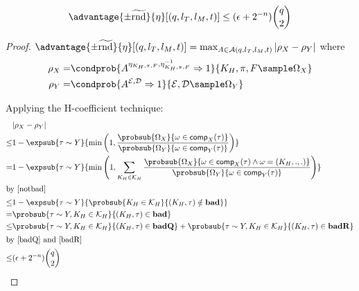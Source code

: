 \documentclass[eprint.tex]{subfiles}
\begin{document}
\begin{lemma} \label{xyadv}
    \begin{displaymath}
        \advantage{\pm \widetilde{\mathrm{rnd}}}{\eta}[(q, l_T, l_M, t)]
        \leq (\epsilon + 2^{-n})\binom{q}{2}
    \end{displaymath}
\end{lemma}

\begin{proof}
    $\advantage{\pm \widetilde{\mathrm{rnd}}}{\eta}[(q, l_T, l_M, t)]
    = \max_{A \in \mathcal{A}(q, l_T, l_M, t)} |\rho_X - \rho_Y|$ where
    \begin{align*}
        \rho_X =& \condprob{A^{\eta_{K_H, \pi, F}, \eta_{K_H, \pi, F}^{-1}}\Rightarrow 1}{K_H, \pi, F \sample \Omega_X} \\
        \rho_Y =& \condprob{A^{\mathcal{E}, \mathcal{D}}\Rightarrow 1}{\mathcal{E}, \mathcal{D} \sample \Omega_Y} \\
    \end{align*}

    Applying the H-coefficient technique:
    \begin{align*}
        &|\rho_X - \rho_Y| \\
        \leq& 1 - \expsub{\tau \sim Y}{\min
            \left(1,
               \frac{\probsub{\Omega_X}{\omega \in \comp_X(\tau)}}
               {\probsub{\Omega_Y}{\omega \in \comp_Y(\tau)}}
            \right)} \\
        =& 1 - \expsub{\tau \sim Y}{\min
            \left(1, \sum_{K_H \in \mathcal{K}_H}
              \frac{\probsub{\Omega_X}{\omega \in \comp_X(\tau) \wedge \omega = (K_H, ., .)}}
              {\probsub{\Omega_Y}{\omega \in \comp_Y(\tau)}}
            \right)} \\
        \intertext{by \autoref{notbad}}
        \leq& 1 - \expsub{\tau \sim Y}{
            \probsub{K_H \in \mathcal{K}_H}{(K_H, \tau) \notin \bad}} \\
        = & \probsub{\tau \sim Y, K_H \in \mathcal{K}_H}{(K_H, \tau) \in \bad} \\
        \leq & \probsub{\tau \sim Y, K_H \in \mathcal{K}_H}{(K_H, \tau) \in \badQ}
         + \probsub{\tau \sim Y, K_H \in \mathcal{K}_H}{(K_H, \tau) \in \badR} \\
         \intertext{by \autoref{badQ} and \autoref{badR}}
        \leq & (\epsilon + 2^{-n})\binom{q}{2} \\
    \end{align*}
\end{proof}
\end{document}
